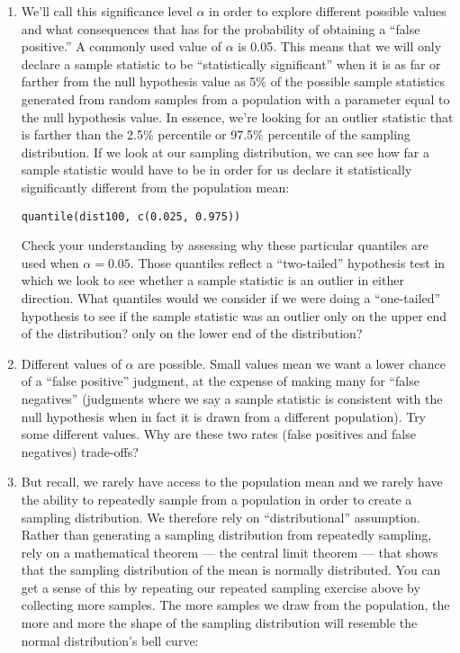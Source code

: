 \documentclass[a4paper,12pt]{article}
\begin{document}
\begin{enumerate}
\item We'll call this significance level $\alpha$ in order to explore different possible values and what consequences that has for the probability of obtaining a ``false positive.'' A commonly used value of $\alpha$ is 0.05. This means that we will only declare a sample statistic to be ``statistically significant'' when it is as far or farther from the null hypothesis value as 5\% of the possible sample statistics generated from random samples from a population with a parameter equal to the null hypothesis value. In essence, we're looking for an outlier statistic that is farther than the 2.5\% percentile or 97.5\% percentile of the sampling distribution. If we look at our sampling distribution, we can see how far a sample statistic would have to be in order for us declare it statistically significantly different from the population mean:

\begin{verbatim}
quantile(dist100, c(0.025, 0.975))
\end{verbatim}

\noindent Check your understanding by assessing why these particular quantiles are used when $\alpha = 0.05$. Those quantiles reflect a ``two-tailed'' hypothesis test in which we look to see whether a sample statistic is an outlier in either direction. What quantiles would we consider if we were doing a ``one-tailed'' hypothesis to see if the sample statistic was an outlier only on the upper end of the distribution? only on the lower end of the distribution?

\item Different values of $\alpha$ are possible. Small values mean we want a lower chance of a ``false positive'' judgment, at the expense of making many for ``false negatives'' (judgments where we say a sample statistic is consistent with the null hypothesis when in fact it is drawn from a different population). Try some different values. Why are these two rates (false positives and false negatives) trade-offs?

\item But recall, we rarely have access to the population mean and we rarely have the ability to repeatedly sample from a population in order to create a sampling distribution. We therefore rely on ``distributional'' assumption. Rather than generating a sampling distribution from repeatedly sampling, rely on a mathematical theorem --- the central limit theorem --- that shows that the sampling distribution of the mean is normally distributed. You can get a sense of this by repeating our repeated sampling exercise above by collecting more samples. The more samples we draw from the population, the more and more the shape of the sampling distribution will resemble the normal distribution's bell curve:


\end{enumerate}
\end{document}
